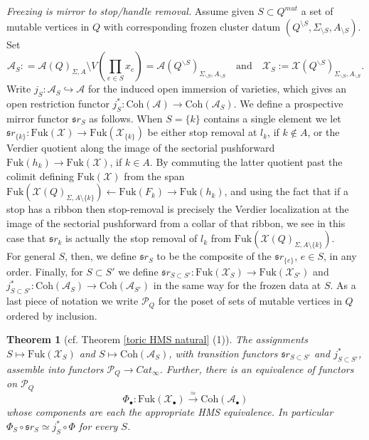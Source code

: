 \documentclass[11pt]{amsart}
\newtheorem{thm}{Theorem}[section]
\theoremstyle{definition}
\theoremstyle{remark}
\newcommand{\A}{\mathcal{A}}
\newcommand{\X}{\mathcal{X}}
\newcommand{\Coh}{\mathrm{Coh}}
\newcommand{\Fuk}{\mathrm{Fuk}}
\numberwithin{equation}{section}
\begin{document}
    \noindent \textit{Freezing is mirror to stop/handle removal.} Assume given $S \subset Q^{mut}$ a set of mutable vertices in $Q$ with corresponding frozen cluster datum $(Q^{\setminus S},\Sigma_{\setminus S},A_{\setminus S})$. Set
$$
\A_S: =\A(Q)_{\Sigma,A}\setminus V(\prod_{e\in S}x_e)= \A(Q^{\backslash S})_{\Sigma_{\backslash S},A_{\backslash S}}\quad\text{and}\quad \X_S:=\X(Q^{\backslash S})_{\Sigma_{\backslash S},A_{\backslash S}}.$$
Write $j_S: \A_S \hookrightarrow \A$ for the induced open immersion of varieties, which gives an open restriction functor $j^*_S: \Coh(\A) \rightarrow \Coh(\A_S)$. We define a prospective mirror functor $\mathfrak sr_S$ as follows. When $S = \{k\}$ contains a single element we let $\mathfrak sr_{\{k\}}\colon \Fuk(\X)\to \Fuk(\X_{\{k\}})$ be either stop removal at $l_k$, if $k \notin A$, or the Verdier quotient along the image of the sectorial pushforward $\Fuk(h_k) \rightarrow \Fuk(\X)$, if $k \in A$. By commuting the latter quotient past the colimit defining $\Fuk(\X)$ from the span $\Fuk(\mathcal{X}(Q)_{\Sigma, A \setminus \{k\}}) \leftarrow \Fuk(F_k) \rightarrow \Fuk(h_k)$, and using the fact that if a stop has a ribbon then stop-removal is precisely the Verdier localization at the image of the sectorial pushforward from a collar of that ribbon, we see in this case that $\mathfrak sr_k$ is actually the stop removal of $l_k$ from $\Fuk(\mathcal{X}(Q)_{\Sigma, A \setminus \{k\}})$.\\

For general $S$, then, we define $\mathfrak sr_S$ to be the composite of the $\mathfrak sr_{\{e\}}$, $e\in S$, in any order. Finally, for $S\subset S'$ we define $\mathfrak sr_{S\subset S'}: \Fuk(\X_S)\to \Fuk(\X_{S'})$ and $j^*_{S\subset S'}: \Coh(\A_S)\rightarrow \Coh(\A_{S'})$ in the same way for the frozen data at $S$. As a last piece of notation we write $\mathcal{P}_Q$ for the poset of sets of mutable vertices in $Q$ ordered by inclusion.
 
\begin{thm}[cf. Theorem \ref{toric HMS natural} (1)]\label{cor:freezing}
The assignments $S\mapsto \Fuk(\X_S)$ and $S \mapsto \Coh(\A_S)$, with transition functors $\mathfrak sr_{S\subset S'}$ and $j^*_{S\subset S'}$, assemble into functors $\mathcal{P}_Q \to Cat_\infty$. Further, there is an equivalence of functors on $\mathcal{P}_Q$
$$
\Phi_\bullet\colon \Fuk(\X_\bullet)\xrightarrow{\ \simeq\ } \Coh(\A_\bullet)$$
whose components are each the appropriate HMS equivalence. In particular $\Phi_S\circ \mathfrak sr_S\simeq j_S^*\circ\Phi$ for every $S$.
\end{thm}
\end{document}
